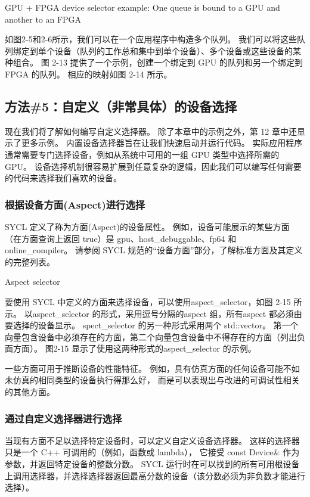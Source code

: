 {\color{red} GPU + FPGA device selector example: One queue is bound to a GPU and another to an FPGA}

如图2-5和2-6所示，我们可以在一个应用程序中构造多个队列。 
我们可以将这些队列绑定到单个设备（队列的工作总和集中到单个设备）、多个设备或这些设备的某种组合。 
图 2-13 提供了一个示例，创建一个绑定到 GPU 的队列和另一个绑定到 FPGA 的队列。 相应的映射如图 2-14 所示。

\subsection{方法\#5：自定义（非常具体）的设备选择}
现在我们将了解如何编写自定义选择器。 除了本章中的示例之外，第 12 章中还显示了更多示例。
内置设备选择器旨在让我们快速启动并运行代码。 
实际应用程序通常需要专门选择设备，例如从系统中可用的一组 GPU 类型中选择所需的 GPU。 
设备选择机制很容易扩展到任意复杂的逻辑，因此我们可以编写任何需要的代码来选择我们喜欢的设备。

\subsubsection{根据设备方面(Aspect)进行选择}
SYCL 定义了称为方面(Aspect)的设备属性。 
例如，设备可能展示的某些方面（在方面查询上返回 true）是 gpu、host\_debuggable、fp64 和 online\_compiler。 
请参阅 SYCL 规范的“设备方面”部分，了解标准方面及其定义的完整列表。

{\color{red} Aspect selector }

要使用 SYCL 中定义的方面来选择设备，可以使用aspect\_selector，如图 2-15 所示。 
以aspect\_selector 的形式，采用逗号分隔的aspect 组，所有aspect 都必须由要选择的设备显示。 
spect\_selector 的另一种形式采用两个 std::vector。 
第一个向量包含设备中必须存在的方面，第二个向量包含设备中不得存在的方面（列出负面方面）。 
图2-15 显示了使用这两种形式的aspect\_selector 的示例。

一些方面可用于推断设备的性能特征。 例如，具有仿真方面的任何设备可能不如未仿真的相同类型的设备执行得那么好，
而是可以表现出与改进的可调试性相关的其他方面。

\subsubsection{通过自定义选择器进行选择}
当现有方面不足以选择特定设备时，可以定义自定义设备选择器。 
这样的选择器只是一个 C++ 可调用的（例如，函数或 lambda），
它接受 const Device\& 作为参数，并返回特定设备的整数分数。 
SYCL 运行时在可以找到的所有可用根设备上调用选择器，并选择选择器返回最高分数的设备（该分数必须为非负数才能进行选择）。

